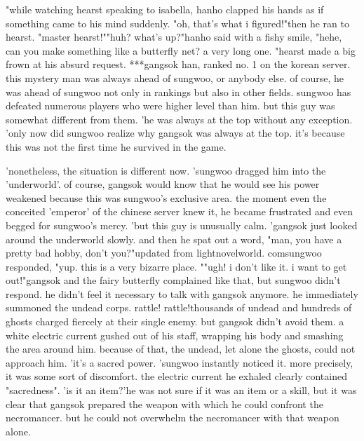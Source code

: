 "while watching hearst speaking to isabella, hanho clapped his hands as if something came to his mind suddenly.
 "oh, that's what i figured!"then he ran to hearst.
"master hearst!""huh? what's up?"hanho said with a fishy smile, "hehe, can you make something like a butterfly net? a very long one.
"hearst made a big frown at his absurd request.
***gangsok han, ranked no.
 1 on the korean server.
this mystery man was always ahead of sungwoo, or anybody else.
of course, he was ahead of sungwoo not only in rankings but also in other fields.
 sungwoo has defeated numerous players who were higher level than him.
but this guy was somewhat different from them.
 'he was always at the top without any exception.
'only now did sungwoo realize why gangsok was always at the top.
 it's because this was not the first time he survived in the game.


'nonetheless, the situation is different now.
'sungwoo dragged him into the 'underworld'.
 of course, gangsok would know that he would see his power weakened because this was sungwoo's exclusive area.
the moment even the conceited 'emperor' of the chinese server knew it, he became frustrated and even begged for sungwoo's mercy.
'but this guy is unusually calm.
'gangsok just looked around the underworld slowly.
 and then he spat out a word, "man, you have a pretty bad hobby, don't you?"updated from lightnovelworld.
c­omsungwoo responded, "yup.
 this is a very bizarre place.
""ugh! i don't like it.
 i want to get out!"gangsok and the fairy butterfly complained like that, but sungwoo didn't respond.
he didn't feel it necessary to talk with gangsok anymore.
 he immediately summoned the undead corps.
rattle! rattle!thousands of undead and hundreds of ghosts charged fiercely at their single enemy.
but gangsok didn't avoid them.
a white electric current gushed out of his staff, wrapping his body and smashing the area around him.
 because of that, the undead, let alone the ghosts, could not approach him.
 'it's a sacred power.
'sungwoo instantly noticed it.
 more precisely, it was some sort of discomfort.
 the electric current he exhaled clearly contained "sacredness".
'is it an item?'he was not sure if it was an item or a skill, but it was clear that gangsok prepared the weapon with which he could confront the necromancer.
 but he could not overwhelm the necromancer with that weapon alone.


 